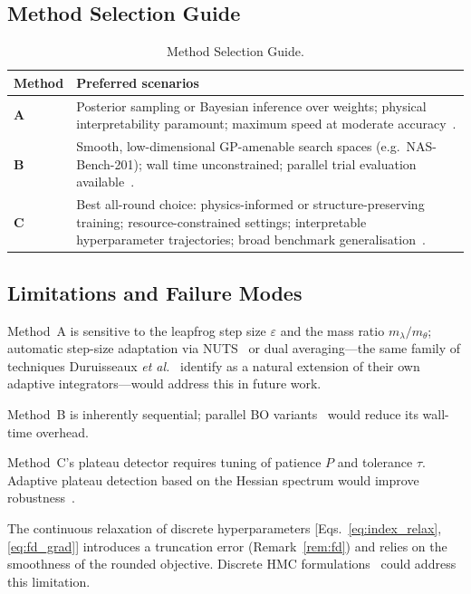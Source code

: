 \documentclass[11pt]{article}
\theoremstyle{definition}
\begin{document}
\subsection{Method Selection Guide}

\begin{table}[H]
\centering
\caption{Method Selection Guide.}
\label{tab:guide}
\renewcommand{\arraystretch}{1.35}
\begin{tabular}{p{1.6cm}p{5.8cm}}
\toprule
\textbf{Method} & \textbf{Preferred scenarios} \\
\midrule
\textbf{A} & Posterior sampling or Bayesian inference over
weights; physical interpretability paramount; maximum
speed at moderate accuracy~\cite{betancourt2017}. \\
\midrule
\textbf{B} & Smooth, low-dimensional GP-amenable search spaces
(e.g.~NAS-Bench-201); wall time unconstrained; parallel
trial evaluation available~\cite{snoek2012}. \\
\midrule
\textbf{C} & Best all-round choice: physics-informed or
structure-preserving training; resource-constrained
settings; interpretable hyperparameter trajectories;
broad benchmark generalisation~\cite{kiyani2025}. \\
\bottomrule
\end{tabular}
\end{table}

\subsection{Limitations and Failure Modes}

Method~A is sensitive to the leapfrog step size $\varepsilon$ and the
mass ratio $m_\lambda/m_\theta$; automatic step-size adaptation via
NUTS~\cite{hoffman2014nuts} or dual averaging---the same family of
techniques Duruisseaux \emph{et al.}~\cite{duruisseaux2021adaptive}
identify as a natural extension of their own adaptive
integrators---would address this in future work.

Method~B is inherently sequential; parallel BO
variants~\cite{shahriari2016bo} would reduce its wall-time overhead.

Method~C's plateau detector requires tuning of patience $P$ and
tolerance $\tau$. Adaptive plateau detection based on the Hessian
spectrum would improve robustness~\cite{rathore2024,dobson2025connections}.

The continuous relaxation of discrete hyperparameters
[Eqs.~\eqref{eq:index_relax}, \eqref{eq:fd_grad}] introduces a
truncation error (Remark~\ref{rem:fd}) and relies on the smoothness
of the rounded objective. Discrete HMC formulations~\cite{neal2011}
could address this limitation.
\end{document}
